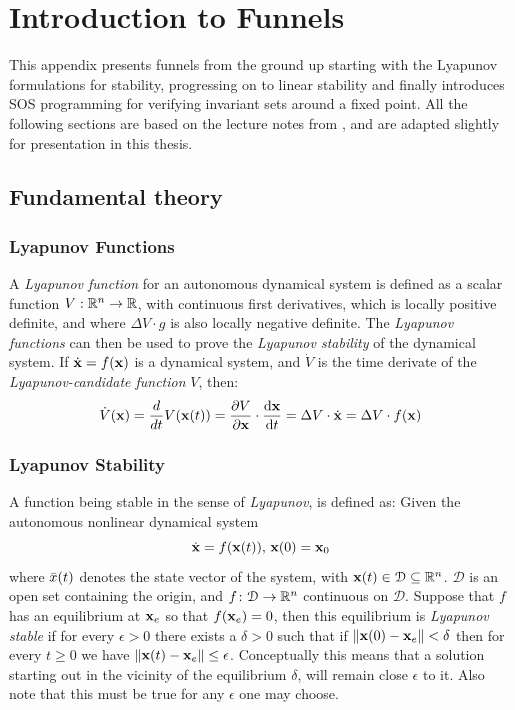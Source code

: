 \chapter{Introduction to Funnels}
\label{sec:first-app}

This appendix presents funnels from the ground up starting with the Lyapunov
formulations for stability, progressing on to linear stability and finally
introduces \ac{SOS} programming for verifying invariant sets around a fixed
point. All the following sections are based on the lecture notes from
\cite{tedrakeUnderactuatedRoboticsAlgorithms2019}, and are adapted slightly for
presentation in this thesis.

\section{Fundamental theory}

\subsection{Lyapunov Functions}

A \textit{Lyapunov function} for an autonomous dynamical system is defined as a
scalar function \(V: \mathbb{R}^n \rightarrow \mathbb{R}\), with continuous first derivatives,
which is locally positive definite, and where \(\Delta V \cdot g\) is also
locally negative definite. The \textit{Lyapunov functions} can then be used to
prove the \textit{Lyapunov stability} of the dynamical system. If
\(\dot{\mathbf{x}} = f(\mathbf{x})\) is a dynamical system, and \(\dot{V}\) is the
time derivate of the \textit{Lyapunov-candidate function} \(V\), then:
\[
  \dot{V}(\mathbf{x}) = \frac{d}{dt}V(\mathbf{x}(t)) = \frac{\partial V}{\partial
    \mathbf{x}} \cdot \frac{\mathrm{d}\mathbf{x}}{\mathrm{d}t} = \Delta V \cdot
  \dot{\mathbf{x}} = \Delta V \cdot f(\mathbf{x})
\]

\subsection{Lyapunov Stability}

A function being stable in the sense of \textit{Lyapunov}, is defined as: Given
the autonomous nonlinear dynamical system
\[
  \dot{\mathbf{x}} = f(\mathbf{x}(t)), \, \mathbf{x}(0) = \mathbf{x}_0
\]
where \(\bar{x}(t)\) denotes the state vector of the system, with \(\mathbf{x}(t) \in
\mathcal{D} \subseteq \mathbb{R}^n\). \(\mathcal{D}\) is an open set containing the
origin, and \(f \colon \mathcal{D} \rightarrow \mathbb{R}^n\) continuous on
\(\mathcal{D}\). Suppose that \(f\) has an equilibrium at \(\mathbf{x}_e\) so that
\(f(\mathbf{x}_e) = 0\), then this equilibrium is \textit{Lyapunov stable} if for
every \(\epsilon > 0\) there exists a \(\delta > 0\) such that if \(\left \lVert
  \mathbf{x}(0) - \mathbf{x}_e \right \rVert < \delta\) then for every \(t \geq 0\)
we have \( \lVert \mathbf{x}(t) - \mathbf{x}_e \rVert \leq \epsilon\). Conceptually
this means that a solution starting out in the vicinity of the equilibrium
\(\delta\), will remain close \(\epsilon\) to it. Also note that this must be
true for any \(\epsilon\) one may choose.

